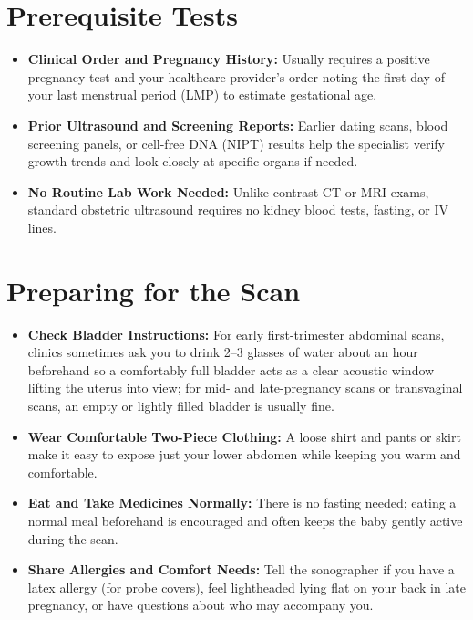\section{Prerequisite Tests}
\begin{itemize}
\item \textbf{Clinical Order and Pregnancy History:} Usually requires a positive pregnancy test and your healthcare provider's order noting the first day of your last menstrual period (LMP) to estimate gestational age.
\item \textbf{Prior Ultrasound and Screening Reports:} Earlier dating scans, blood screening panels, or cell-free DNA (NIPT) results help the specialist verify growth trends and look closely at specific organs if needed.
\item \textbf{No Routine Lab Work Needed:} Unlike contrast CT or MRI exams, standard obstetric ultrasound requires no kidney blood tests, fasting, or IV lines.
\end{itemize}

\section{Preparing for the Scan}
\begin{itemize}
\item \textbf{Check Bladder Instructions:} For early first-trimester abdominal scans, clinics sometimes ask you to drink 2--3 glasses of water about an hour beforehand so a comfortably full bladder acts as a clear acoustic window lifting the uterus into view; for mid- and late-pregnancy scans or transvaginal scans, an empty or lightly filled bladder is usually fine.
\item \textbf{Wear Comfortable Two-Piece Clothing:} A loose shirt and pants or skirt make it easy to expose just your lower abdomen while keeping you warm and comfortable.
\item \textbf{Eat and Take Medicines Normally:} There is no fasting needed; eating a normal meal beforehand is encouraged and often keeps the baby gently active during the scan.
\item \textbf{Share Allergies and Comfort Needs:} Tell the sonographer if you have a latex allergy (for probe covers), feel lightheaded lying flat on your back in late pregnancy, or have questions about who may accompany you.
\end{itemize}

